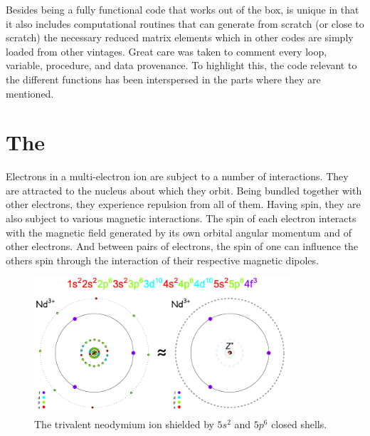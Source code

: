 \documentclass[11pt, twoside,openright]{article}
\begin{document}
Besides being a fully functional code that works out of the box, \qlanth is unique in that it also includes computational routines that can generate from scratch (or close to scratch) the necessary reduced matrix elements which in other codes are simply loaded from other vintages. Great care was taken to comment every loop, variable, procedure, and data provenance. To highlight this, the code relevant to the different functions has been interspersed in the parts where they are mentioned.

\vspace*{\fill}

\newpage

\hypertarget{toc}{}

\vspace*{\fill}

\tableofcontents \label{toc}

\vspace*{\fill}

\newpage


\section{The \hamilton}\label{section:the-semi-hamiltonian}

Electrons in a multi-electron ion are subject to a number of interactions. They are attracted to the nucleus about which they orbit. Being bundled together with other electrons, they experience repulsion from all of them. Having spin, they are also subject to various magnetic interactions. The spin of each electron interacts with the magnetic field generated by its own orbital angular momentum and of other electrons. And between pairs of electrons, the spin of one can influence the others spin through the interaction of their respective magnetic dipoles.

\begin{figure}[h!]
\centering
\includegraphics[width=0.85\textwidth]{./figures/nd-3-sketch.pdf}	
\caption{The trivalent neodymium ion shielded by $5s^2$ and $5p^6$ closed shells.}
\label{fig:trivalent-nd-sketch}
\end{figure}
\end{document}
